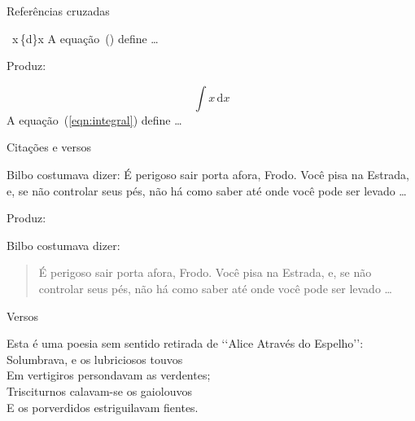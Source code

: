 \begin{frame}{Referências cruzadas}

\begin{LaTeXcode}[Exemplo]
 \n
\string\int\ x\string\,\string\mathrm\{d\}x\n
{}\n
A equação~() define \string\dots
\end{LaTeXcode}

Produz:
\begin{LaTeXoutput}
\begin{equation} \label{eqn:integral}
\int x\,\mathrm{d}x
\end{equation}
A equação~(\ref{eqn:integral}) define \dots
\end{LaTeXoutput}
\end{frame}

\begin{frame}{Citações e versos}
\begin{LaTeXcode}[Exemplo]
Bilbo costumava dizer:\n
{}\n
É perigoso sair porta afora, Frodo. Você pisa na Estrada, e, se não controlar seus pés, não há como saber até onde você pode ser levado \ldots\n
{}
\end{LaTeXcode}

Produz:

\begin{LaTeXoutput}
Bilbo costumava dizer:
\begin{quote}\normalfont
É perigoso sair porta afora, Frodo. Você pisa na Estrada, e, se não controlar seus pés, não há como saber até onde você pode ser levado \ldots
\end{quote}
\end{LaTeXoutput}
\end{frame}

\begin{frame}{Versos}
\begin{LaTeXcode}
Esta é uma poesia sem sentido retirada de
`{}`Alice Através do Espelho'{}':
\nn
{}\n
{}\n
{}\n
{}\n
Solumbrava, e os lubriciosos touvos \string\\ \n
Em vertigiros persondavam as verdentes; \string\\ \n
Trisciturnos calavam-se os gaiolouvos \string\\ \n
E os porverdidos estriguilavam fientes.\n
{}
\end{LaTeXcode}
\end{frame}

